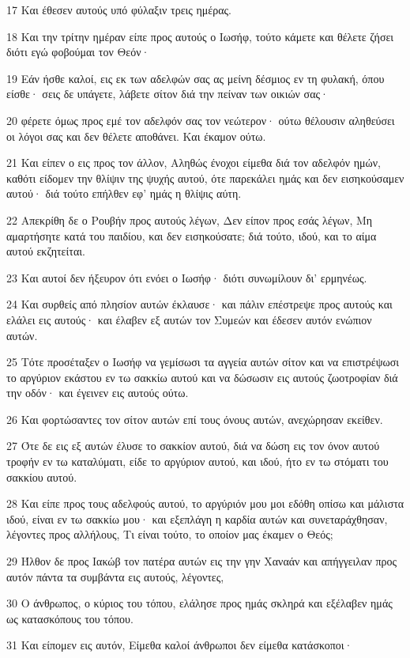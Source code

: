 \par 17 Και έθεσεν αυτούς υπό φύλαξιν τρεις ημέρας.
\par 18 Και την τρίτην ημέραν είπε προς αυτούς ο Ιωσήφ, τούτο κάμετε και θέλετε ζήσει διότι εγώ φοβούμαι τον Θεόν·
\par 19 Εάν ήσθε καλοί, εις εκ των αδελφών σας ας μείνη δέσμιος εν τη φυλακή, όπου είσθε· σεις δε υπάγετε, λάβετε σίτον διά την πείναν των οικιών σας·
\par 20 φέρετε όμως προς εμέ τον αδελφόν σας τον νεώτερον· ούτω θέλουσιν αληθεύσει οι λόγοι σας και δεν θέλετε αποθάνει. Και έκαμον ούτω.
\par 21 Και είπεν ο εις προς τον άλλον, Αληθώς ένοχοι είμεθα διά τον αδελφόν ημών, καθότι είδομεν την θλίψιν της ψυχής αυτού, ότε παρεκάλει ημάς και δεν εισηκούσαμεν αυτού· διά τούτο επήλθεν εφ' ημάς η θλίψις αύτη.
\par 22 Απεκρίθη δε ο Ρουβήν προς αυτούς λέγων, Δεν είπον προς εσάς λέγων, Μη αμαρτήσητε κατά του παιδίου, και δεν εισηκούσατε; διά τούτο, ιδού, και το αίμα αυτού εκζητείται.
\par 23 Και αυτοί δεν ήξευρον ότι ενόει ο Ιωσήφ· διότι συνωμίλουν δι' ερμηνέως.
\par 24 Και συρθείς από πλησίον αυτών έκλαυσε· και πάλιν επέστρεψε προς αυτούς και ελάλει εις αυτούς· και έλαβεν εξ αυτών τον Συμεών και έδεσεν αυτόν ενώπιον αυτών.
\par 25 Τότε προσέταξεν ο Ιωσήφ να γεμίσωσι τα αγγεία αυτών σίτον και να επιστρέψωσι το αργύριον εκάστου εν τω σακκίω αυτού και να δώσωσιν εις αυτούς ζωοτροφίαν διά την οδόν· και έγεινεν εις αυτούς ούτω.
\par 26 Και φορτώσαντες τον σίτον αυτών επί τους όνους αυτών, ανεχώρησαν εκείθεν.
\par 27 Ότε δε εις εξ αυτών έλυσε το σακκίον αυτού, διά να δώση εις τον όνον αυτού τροφήν εν τω καταλύματι, είδε το αργύριον αυτού, και ιδού, ήτο εν τω στόματι του σακκίου αυτού.
\par 28 Και είπε προς τους αδελφούς αυτού, το αργύριόν μου μοι εδόθη οπίσω και μάλιστα ιδού, είναι εν τω σακκίω μου· και εξεπλάγη η καρδία αυτών και συνεταράχθησαν, λέγοντες προς αλλήλους, Τι είναι τούτο, το οποίον μας έκαμεν ο Θεός;
\par 29 Ήλθον δε προς Ιακώβ τον πατέρα αυτών εις την γην Χαναάν και απήγγειλαν προς αυτόν πάντα τα συμβάντα εις αυτούς, λέγοντες,
\par 30 Ο άνθρωπος, ο κύριος του τόπου, ελάλησε προς ημάς σκληρά και εξέλαβεν ημάς ως κατασκόπους του τόπου.
\par 31 Και είπομεν εις αυτόν, Είμεθα καλοί άνθρωποι δεν είμεθα κατάσκοποι·
